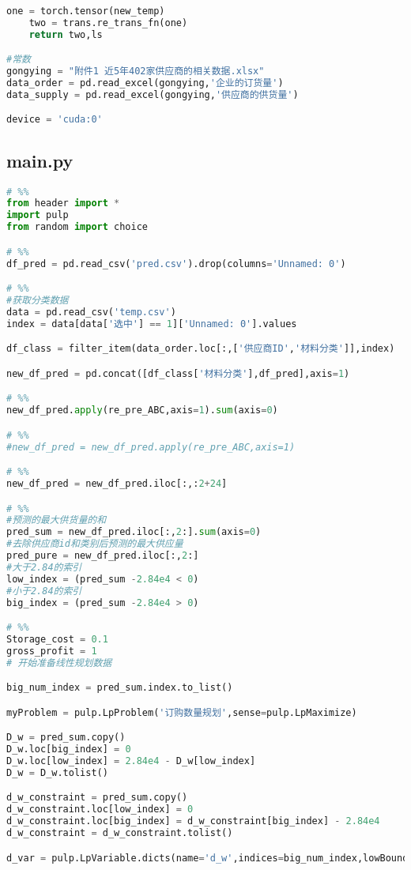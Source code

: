 \begin{appendices}
\begin{lstlisting}[language=python]
    one = torch.tensor(new_temp)
    two = trans.re_trans_fn(one)
    return two,ls

#常数
gongying = "附件1 近5年402家供应商的相关数据.xlsx"
data_order = pd.read_excel(gongying,'企业的订货量')
data_supply = pd.read_excel(gongying,'供应商的供货量')

device = 'cuda:0'
\end{lstlisting}

\subsection{main.py}

\begin{lstlisting}[language=python]
# %%
from header import *
import pulp
from random import choice

# %%
df_pred = pd.read_csv('pred.csv').drop(columns='Unnamed: 0')

# %%
#获取分类数据
data = pd.read_csv('temp.csv')
index = data[data['选中'] == 1]['Unnamed: 0'].values

df_class = filter_item(data_order.loc[:,['供应商ID','材料分类']],index)

new_df_pred = pd.concat([df_class['材料分类'],df_pred],axis=1)

# %%
new_df_pred.apply(re_pre_ABC,axis=1).sum(axis=0)

# %%
#new_df_pred = new_df_pred.apply(re_pre_ABC,axis=1)

# %%
new_df_pred = new_df_pred.iloc[:,:2+24]

# %%
#预测的最大供货量的和
pred_sum = new_df_pred.iloc[:,2:].sum(axis=0)
#去除供应商id和类别后预测的最大供应量
pred_pure = new_df_pred.iloc[:,2:]
#大于2.84的索引
low_index = (pred_sum -2.84e4 < 0)
#小于2.84的索引
big_index = (pred_sum -2.84e4 > 0)

# %%
Storage_cost = 0.1
gross_profit = 1
# 开始准备线性规划数据

big_num_index = pred_sum.index.to_list()

myProblem = pulp.LpProblem('订购数量规划',sense=pulp.LpMaximize)

D_w = pred_sum.copy()
D_w.loc[big_index] = 0
D_w.loc[low_index] = 2.84e4 - D_w[low_index]
D_w = D_w.tolist()

d_w_constraint = pred_sum.copy()
d_w_constraint.loc[low_index] = 0
d_w_constraint.loc[big_index] = d_w_constraint[big_index] - 2.84e4
d_w_constraint = d_w_constraint.tolist()

d_var = pulp.LpVariable.dicts(name='d_w',indices=big_num_index,lowBound=0)


\end{lstlisting}
\end{appendices}
